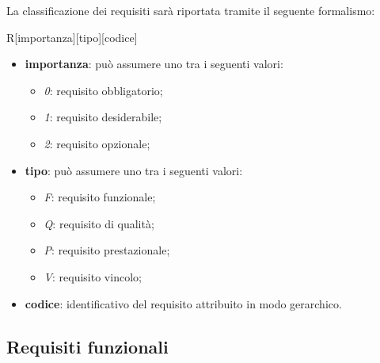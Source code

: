 La classificazione dei requisiti sarà riportata tramite il seguente formalismo:
\begin{center}
	R[importanza][tipo][codice]
\end{center}
\begin{itemize}
	\item \textbf{importanza}: può assumere uno tra i seguenti valori:
	\begin{itemize}
		\item \emph{0}: requisito obbligatorio;
		\item \emph{1}: requisito desiderabile;
		\item \emph{2}: requisito opzionale;
	\end{itemize}
	\item \textbf{tipo}: può assumere uno tra i seguenti valori:
	\begin{itemize}
		\item \emph{F}: requisito funzionale;
		\item \emph{Q}: requisito di qualità;
		\item \emph{P}: requisito prestazionale;
		\item \emph{V}: requisito vincolo;
	\end{itemize}
	\item \textbf{codice}: identificativo del requisito attribuito in modo gerarchico.
\end{itemize}


\subsection{Requisiti funzionali}

